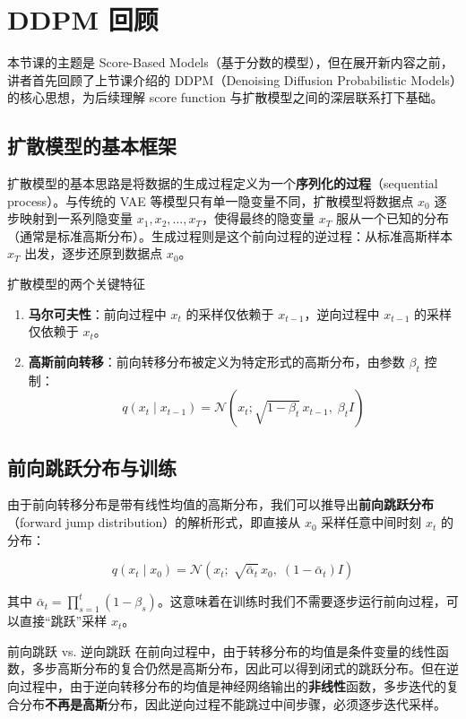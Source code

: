 \section{DDPM 回顾}

本节课的主题是 Score-Based Models（基于分数的模型），但在展开新内容之前，讲者首先回顾了上节课介绍的 DDPM（Denoising Diffusion Probabilistic Models）的核心思想，为后续理解 score function 与扩散模型之间的深层联系打下基础。

\subsection{扩散模型的基本框架}

扩散模型的基本思路是将数据的生成过程定义为一个\textbf{序列化的过程}（sequential process）。与传统的 VAE 等模型只有单一隐变量不同，扩散模型将数据点 $x_0$ 逐步映射到一系列隐变量 $x_1, x_2, \ldots, x_T$，使得最终的隐变量 $x_T$ 服从一个已知的分布（通常是标准高斯分布）。生成过程则是这个前向过程的逆过程：从标准高斯样本 $x_T$ 出发，逐步还原到数据点 $x_0$。

\begin{importantbox}{扩散模型的两个关键特征}
\begin{enumerate}
    \item \textbf{马尔可夫性}：前向过程中 $x_t$ 的采样仅依赖于 $x_{t-1}$，逆向过程中 $x_{t-1}$ 的采样仅依赖于 $x_t$。
    \item \textbf{高斯前向转移}：前向转移分布被定义为特定形式的高斯分布，由参数 $\beta_t$ 控制：
    $$q(x_t \mid x_{t-1}) = \mathcal{N}(x_t; \sqrt{1-\beta_t}\, x_{t-1},\; \beta_t I)$$
\end{enumerate}
\end{importantbox}

\subsection{前向跳跃分布与训练}

由于前向转移分布是带有线性均值的高斯分布，我们可以推导出\textbf{前向跳跃分布}（forward jump distribution）的解析形式，即直接从 $x_0$ 采样任意中间时刻 $x_t$ 的分布：

$$q(x_t \mid x_0) = \mathcal{N}(x_t;\; \sqrt{\bar{\alpha}_t}\, x_0,\; (1-\bar{\alpha}_t) I)$$

其中 $\bar{\alpha}_t = \prod_{s=1}^{t}(1-\beta_s)$。这意味着在训练时我们不需要逐步运行前向过程，可以直接``跳跃''采样 $x_t$。

\begin{knowledgebox}{前向跳跃 vs. 逆向跳跃}
在前向过程中，由于转移分布的均值是条件变量的线性函数，多步高斯分布的复合仍然是高斯分布，因此可以得到闭式的跳跃分布。但在逆向过程中，由于逆向转移分布的均值是神经网络输出的\textbf{非线性}函数，多步迭代的复合分布\textbf{不再是高斯}分布，因此逆向过程不能跳过中间步骤，必须逐步迭代采样。
\end{knowledgebox}

